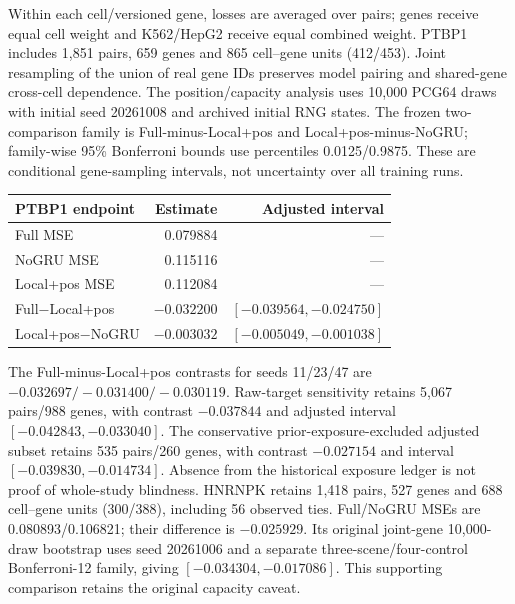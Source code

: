 \documentclass[11pt]{article}
\begin{document}
Within each cell/versioned gene, losses are averaged over pairs; genes receive equal cell weight and K562/HepG2 receive equal combined weight. PTBP1 includes 1,851 pairs, 659 genes and 865 cell--gene units (412/453). Joint resampling of the union of real gene IDs preserves model pairing and shared-gene cross-cell dependence. The position/capacity analysis uses 10,000 PCG64 draws with initial seed 20261008 and archived initial RNG states. The frozen two-comparison family is Full-minus-Local+pos and Local+pos-minus-NoGRU; family-wise 95\% Bonferroni bounds use percentiles 0.0125/0.9875. These are conditional gene-sampling intervals, not uncertainty over all training runs.

\begin{center}\small
\begin{tabular}{@{}lrr@{}}\toprule
PTBP1 endpoint & Estimate & Adjusted interval \\
\midrule
Full MSE & 0.079884 & --- \\
NoGRU MSE & 0.115116 & --- \\
Local+pos MSE & 0.112084 & --- \\
Full$-$Local+pos & $-0.032200$ & $[-0.039564,-0.024750]$ \\
Local+pos$-$NoGRU & $-0.003032$ & $[-0.005049,-0.001038]$ \\
\bottomrule\end{tabular}\end{center}

The Full-minus-Local+pos contrasts for seeds 11/23/47 are $-0.032697/-0.031400/-0.030119$. Raw-target sensitivity retains 5,067 pairs/988 genes, with contrast $-0.037844$ and adjusted interval $[-0.042843,-0.033040]$. The conservative prior-exposure-excluded adjusted subset retains 535 pairs/260 genes, with contrast $-0.027154$ and interval $[-0.039830,-0.014734]$. Absence from the historical exposure ledger is not proof of whole-study blindness. HNRNPK retains 1,418 pairs, 527 genes and 688 cell--gene units (300/388), including 56 observed ties. Full/NoGRU MSEs are 0.080893/0.106821; their difference is $-0.025929$. Its original joint-gene 10,000-draw bootstrap uses seed 20261006 and a separate three-scene/four-control Bonferroni-12 family, giving $[-0.034304,-0.017086]$. This supporting comparison retains the original capacity caveat.
\end{document}
